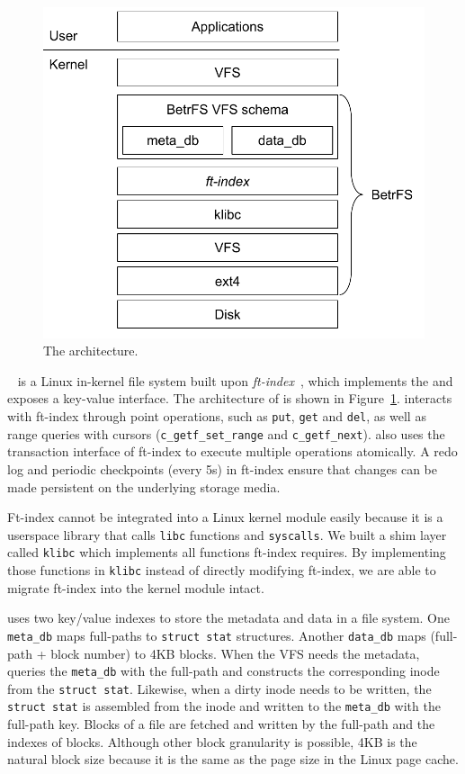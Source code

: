 \subsection{\betrfs}

\begin{figure}
  \centering
  \includegraphics[width=.5\textwidth]{fig/betrfs}
  \caption{\label{fig:betrfs} The \betrfs architecture.}
\end{figure}

\betrfs~\cite{betrfs1,betrfs1tos,betrfs2,betrfs2tos,betrfs3,betrfs4} is a Linux
in-kernel file system built upon \textit{ft-index}~\cite{ftindex},
which implements the \bet and exposes a key-value interface.
The architecture of \betrfs is shown in Figure~\ref{fig:betrfs}.
\betrfs interacts with ft-index through point operations, such as \texttt{put},
\texttt{get} and \texttt{del}, as well as range queries with cursors
(\texttt{c\_getf\_set\_range} and \texttt{c\_getf\_next}).
\betrfs also uses the transaction interface of ft-index to execute multiple
operations atomically.
A redo log and periodic checkpoints (every 5s) in ft-index ensure that changes
can be made persistent on the underlying storage media.

Ft-index cannot be integrated into a Linux kernel module easily because
it is a userspace library that calls \texttt{libc} functions and
\texttt{syscalls}.
We built a shim layer called \texttt{klibc} which implements all functions
ft-index requires.
By implementing those functions in \texttt{klibc} instead of directly modifying
ft-index,
we are able to migrate ft-index into the kernel module intact.

\betrfs uses two key/value indexes to store the metadata and data in a file
system.
One \texttt{meta\_db} maps full-paths to \texttt{struct stat} structures.
Another \texttt{data\_db} maps (full-path + block number) to 4KB blocks.
When the VFS needs the metadata, \betrfs queries the \texttt{meta\_db} with the
full-path and constructs the corresponding inode from the \texttt{struct stat}.
Likewise, when a dirty inode needs to be written, the \texttt{struct stat} is
assembled from the inode and written to the \texttt{meta\_db} with the
full-path key.
Blocks of a file are fetched and written by the full-path and the indexes of
blocks.
Although other block granularity is possible, 4KB is the natural block size
because it is the same as the page size in the Linux page cache.

